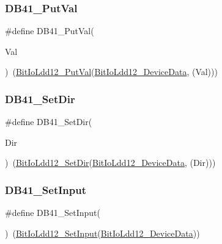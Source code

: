 \subsubsection{\texorpdfstring{D\+B41\+\_\+\+Put\+Val}{DB41\_PutVal}}
{\footnotesize\ttfamily \#define D\+B41\+\_\+\+Put\+Val(\begin{DoxyParamCaption}\item[{}]{Val }\end{DoxyParamCaption})~(\hyperlink{group___bit_io_ldd12__module_ga9db76c4359c6a7420209b0a4c6c4b940}{Bit\+Io\+Ldd12\+\_\+\+Put\+Val}(\hyperlink{group___bit_io_ldd12__module_ga7332a1a453879ccef57a59ed20d8fee5}{Bit\+Io\+Ldd12\+\_\+\+Device\+Data}, (Val)))}

\mbox{\label{group___d_b41__module_gacd09e2b28168f293ca5e87389d611946}} 
\subsubsection{\texorpdfstring{D\+B41\+\_\+\+Set\+Dir}{DB41\_SetDir}}
{\footnotesize\ttfamily \#define D\+B41\+\_\+\+Set\+Dir(\begin{DoxyParamCaption}\item[{}]{Dir }\end{DoxyParamCaption})~(\hyperlink{group___bit_io_ldd12__module_ga540c0e8c513ca036a0066aab8833f0ad}{Bit\+Io\+Ldd12\+\_\+\+Set\+Dir}(\hyperlink{group___bit_io_ldd12__module_ga7332a1a453879ccef57a59ed20d8fee5}{Bit\+Io\+Ldd12\+\_\+\+Device\+Data}, (Dir)))}

\mbox{\label{group___d_b41__module_gaa1db55b4896cbc1f99a174982e295b6d}} 
\subsubsection{\texorpdfstring{D\+B41\+\_\+\+Set\+Input}{DB41\_SetInput}}
{\footnotesize\ttfamily \#define D\+B41\+\_\+\+Set\+Input(\begin{DoxyParamCaption}{ }\end{DoxyParamCaption})~(\hyperlink{group___bit_io_ldd12__module_gaf2e24cfdf7dd3071178d0061abb29c56}{Bit\+Io\+Ldd12\+\_\+\+Set\+Input}(\hyperlink{group___bit_io_ldd12__module_ga7332a1a453879ccef57a59ed20d8fee5}{Bit\+Io\+Ldd12\+\_\+\+Device\+Data}))}

